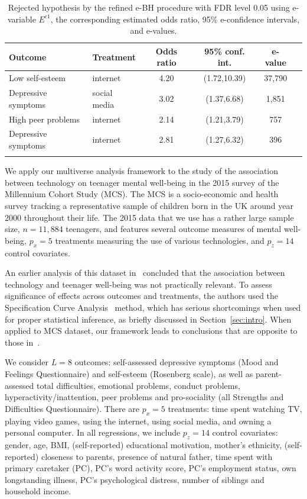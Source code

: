 \documentclass[pdflatex,sn-mathphys-num]{sn-jnl}%
\theoremstyle{thmstyleone}%
\theoremstyle{thmstyletwo}%
\theoremstyle{thmstylethree}%
\begin{document}
\begin{table}[ht]
\caption{Rejected hypothesis by the refined e-BH procedure with FDR level 0.05 using e-variable $E^{c1}$, the corresponding estimated odds ratio, 95\% e-confidence intervals, and e-values.}\label{tab1}%
\begin{tabular}{@{}llcccc@{}}
\toprule
Outcome & Treatment & Odds ratio & 95\% conf. int. & e-value \\
\midrule
Low self-esteem   &  internet & 4.20  &(1.72,10.39) & 37,790 \\
Depressive symptoms    & social media & 3.02 &(1.37,6.68)  & 1,851\\
High peer problems & internet & 2.14   &(1.21,3.79)& 757 \\ 
Depressive symptoms &  internet & 2.81  &(1.27,6.32) & 396\\
\botrule
\end{tabular}
\end{table}

We apply our multiverse analysis framework to the study of the association between technology on teenager mental well-being in the 2015 survey of the Millennium Cohort Study (MCS). The MCS is a socio-economic and health survey tracking a representative sample of children born in the UK around year 2000 throughout their life. The 2015 data that we use has a rather large sample size, $n = 11,884$ teenagers, and features several outcome measures of mental well-being, $p_x=5$ treatments measuring the use of various technologies, and $p_z=14$ control covariates.

An earlier analysis of this dataset in~\cite{orben:2019} concluded that the association between technology and teenager well-being was not practically relevant. To assess significance of effects across outcomes and treatments, the authors used the Specification Curve Analysis~\cite{simonsohn:2020} method, which has serious shortcomings when used for proper statistical inference, as briefly discussed in Section~\ref{sec:intro}. When applied to MCS dataset, our framework leads to conclusions that are opposite to those in~\cite{orben:2019}.

We consider $L=8$ outcomes: self-assessed depressive symptoms (Mood and Feelings Questionnaire) and self-esteem (Rosenberg scale), as well as parent-assessed total difficulties, emotional problems, conduct problems, hyperactivity/inattention, peer problems and pro-sociality (all Strengths and Difficulties Questionnaire). There are $p_x=5$ treatments: time spent watching TV, playing video games, using the internet, using social media, and owning a personal computer. 
In all regressions, we include $p_z=14$ control covariates: gender, age, BMI, (self-reported) educational motivation, mother’s ethnicity, 
(self-reported) closeness to parents, presence of natural father, time spent with primary
caretaker (PC), PC’s word activity score, PC’s employment status, own longstanding
illness, PC’s psychological distress, number of siblings and household income.
\end{document}
